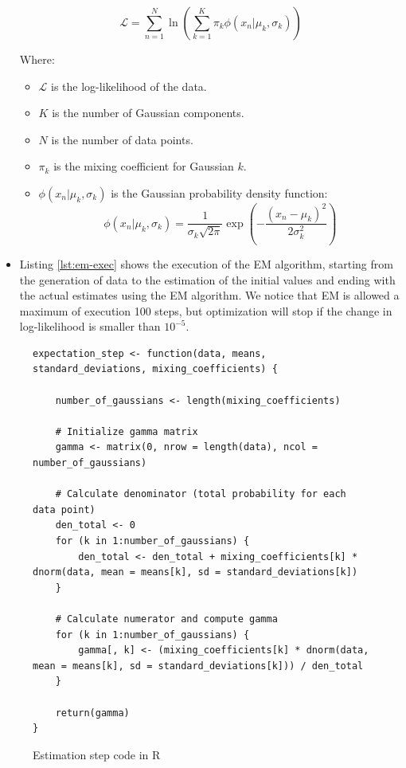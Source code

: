\documentclass[]{article}
\begin{document}
\begin{itemize}
	$$
	\mathcal{L} = \sum_{n=1}^{N} \ln \left( \sum_{k=1}^{K} \pi_k \phi(x_n | \mu_k, \sigma_k) \right)
	$$
	
	Where:
	\begin{itemize}
		\item \( \mathcal{L} \) is the log-likelihood of the data.
		\item \( K \) is the number of Gaussian components.
		\item \( N \) is the number of data points.
		\item \( \pi_k \) is the mixing coefficient for Gaussian \( k \).
		\item \( \phi(x_n | \mu_k, \sigma_k) \) is the Gaussian probability density function:
		$$
		\phi(x_n | \mu_k, \sigma_k) = \frac{1}{\sigma_k \sqrt{2\pi}} \exp \left( -\frac{(x_n - \mu_k)^2}{2\sigma_k^2} \right)
		$$
	\end{itemize}
	
	\item Listing \ref{lst:em-exec} shows the execution of the EM algorithm, starting from the generation of data to the estimation of the initial values and ending with the actual estimates using the EM algorithm. We notice that EM is allowed a maximum of execution 100 steps, but optimization will stop if the change in log-likelihood is smaller than $10^{-5}$.
	
	

\end{itemize}




\begin{figure}[H]
	\captionsetup{type=lstlisting}
	\begin{lstlisting}
expectation_step <- function(data, means, standard_deviations, mixing_coefficients) {
	
	number_of_gaussians <- length(mixing_coefficients)
	
	# Initialize gamma matrix
	gamma <- matrix(0, nrow = length(data), ncol = number_of_gaussians)
	
	# Calculate denominator (total probability for each data point)
	den_total <- 0
	for (k in 1:number_of_gaussians) {
		den_total <- den_total + mixing_coefficients[k] * dnorm(data, mean = means[k], sd = standard_deviations[k])
	}
	
	# Calculate numerator and compute gamma
	for (k in 1:number_of_gaussians) {
		gamma[, k] <- (mixing_coefficients[k] * dnorm(data, mean = means[k], sd = standard_deviations[k])) / den_total
	}
	
	return(gamma)
}			
		\end{lstlisting}
	\caption{Estimation step code in R}
	\label{lst:em-est}
\end{figure}
\end{document}
